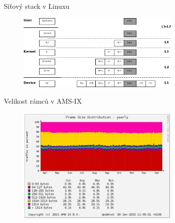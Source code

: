 \documentclass{beamer}
\begin{document}
\begin{frame}{Síťový stack v Linuxu}
	\begin{figure}
			\centering
			\includegraphics[width=8cm,keepaspectratio]{fig/layers.png}
		\end{figure}
\end{frame}




\begin{frame}{Velikost rámců v AMS-IX}
	\begin{figure}
			\centering
			\includegraphics[width=8cm,keepaspectratio]{fig/amsix.png}
		\end{figure}
\end{frame}
\end{document}
